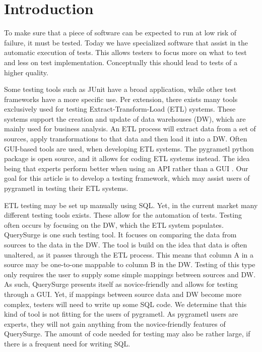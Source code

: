 \section{Introduction} %
To make sure that a piece of software can be expected to run at low risk of failure, it must be tested. Today we have specialized software that assist in the automatic execution of tests. This allows testers to focus more on what to test and less on test implementation. Conceptually this should lead to tests of a higher quality.

Some testing tools such as JUnit have a broad application, while other test frameworks have a more specific use. Per extension, there exists many tools exclusively used for testing Extract-Transform-Load (ETL) systems. These systems support the creation and update of data warehouses (DW), which are mainly used for business analysis. An ETL process will extract data from a set of sources, apply transformations to that data and then load it into a DW. Often GUI-based tools are used, when developing ETL systems. The pygrametl python package is open source, and it allows for coding ETL systems instead. The idea being that experts perform better when using an API rather than a GUI \cite{thomsen2009pygrametl}. Our goal for this article is to develop a testing framework, which may assist users of pygrametl in testing their ETL systems.

ETL testing may be set up manually using SQL. Yet, in the current market many different testing tools exists. These allow for the automation of tests. Testing often occurs by focusing on the DW, which the ETL system populates. QuerySurge\cite{QuerySurge} is one such testing tool. It focuses on comparing the data from sources to the data in the DW. The tool is build on the idea that data is often unaltered, as it passes through the ETL process. This means that column A in a source may be one-to-one mappable to column B in the DW. Testing of this type only requires the user to supply some simple mappings between sources and DW. As such, QuerySurge presents itself as novice-friendly and allows for testing through a GUI. Yet, if mappings between source data and DW become more complex, testers will need to write up some SQL code. We determine that this kind of tool is not fitting for the users of pygrametl. As pygrametl users are experts, they will not gain anything from the novice-friendly features of QuerySurge. The amount of code needed for testing may also be rather large, if there is a frequent need for writing SQL.


